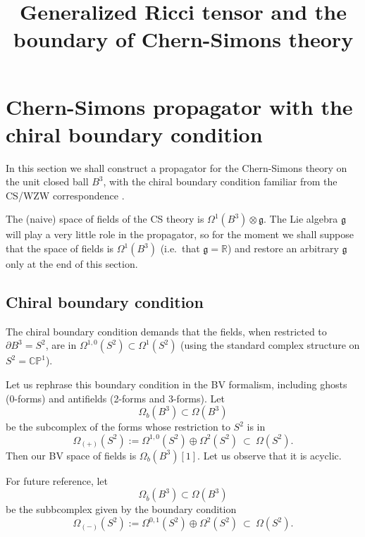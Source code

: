 \documentclass[a4paper]{amsart}
\title{Generalized Ricci tensor and the boundary of Chern-Simons theory}
\theoremstyle{plain}
\theoremstyle{definition}
\newcommand{\g}{\mathfrak{g}}
\newcommand{\R}{\mathbb{R}}
\newcommand{\CP}{\mathbb{CP}^1}
\begin{document}
\maketitle

\section{Chern-Simons propagator with the chiral boundary condition}

In this section we shall construct a propagator for the Chern-Simons theory on the unit closed ball $B^3$, with the chiral boundary condition familiar from the CS/WZW correspondence \cite{W}.

The (naive) space of fields of the CS theory is $\Omega^1(B^3)\otimes\g$. The Lie algebra $\g$ will play a very little role in the propagator, so for the moment we shall suppose that the space of fields is $\Omega^1(B^3)$ (i.e.\ that $\g=\R$) and restore an arbitrary $\g$ only at the  end of this section.

\subsection{Chiral boundary condition}
The chiral boundary condition demands that the fields, when restricted to $\partial B^3 = S^2$, are in $\Omega^{1,0}(S^2)\subset\Omega^1(S^2)$ (using the standard complex structure on $S^2=\CP$). 

Let us rephrase this boundary condition in the BV formalism, including ghosts (0-forms) and antifields (2-forms and 3-forms). Let 
$$\Omega_b(B^3)\subset\Omega(B^3)$$
be the subcomplex of the forms whose restriction to $S^2$ is in
$$\Omega_{(+)}(S^2):=\Omega^{1,0}(S^2)\oplus\Omega^2(S^2)\ \subset\ \Omega(S^2).$$
Then our BV space of fields is
$\Omega_b(B^3)[1]$.
Let us observe that it is acyclic.


For future reference, let 
$$\Omega_{\bar b}(B^3)\subset\Omega(B^3)$$
be the subbcomplex given by the boundary condition
$$\Omega_{(-)}(S^2):=\Omega^{0,1}(S^2)\oplus\Omega^2(S^2)\ \subset\ \Omega(S^2).$$
\end{document}
